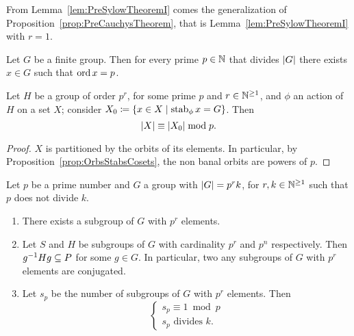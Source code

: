 From Lemma~\ref{lem:PreSylowTheoremI} comes the generalization of Proposition~\ref{prop:PreCauchysTheorem}, that is Lemma~\ref{lem:PreSylowTheoremI} with \(r=1\).

\begin{proposition}\label{prop:CauchysTheorem}
Let \(G\) be a finite group. Then for every prime \(p \in \mathbb N\) that divides \(\left\lvert G\right\rvert\) there exists \(x \in G\) such that \(\operatorname{ord} x = p\).
\end{proposition}

\begin{lemma}\label{lem:PreSylowTheoremII}
Let \(H\) be a group of order \(p^r\), for some prime \(p\) and \(r \in \mathbb N^{\ge 1}\), and \(\phi\) an action of \(H\) on a set \(X\); consider \(X_0 \coloneq \left\{x \in X \mid \operatorname{stab}_\phi x = G\right\}\). Then
\[\left\lvert X\right\rvert \equiv \left\lvert X_0\right\rvert \bmod p .\]
\end{lemma}

\begin{proof}
\(X\) is partitioned by the orbits of its elements. In particular, by Proposition~\ref{prop:OrbsStabsCosets}, the non banal orbits are powers of \(p\).
\end{proof}

\begin{proposition}\label{prop:SylowTheorem}
Let \(p\) be a prime number and  \(G\) a group with \(\left\lvert G\right\rvert = p^rk\), for \(r, k \in \mathbb N^{\ge 1}\) such that \(p\) does not divide \(k\).
\begin{enumerate}
\item There exists a subgroup of \(G\) with \(p^r\) elements.
\item Let \(S\) and \(H\) be subgroups of \(G\) with cardinality \(p^r\) and \(p^n\) respectively. Then \(g^{-1} H g \subseteq P\) for some \(g \in G\). In particular, two any subgroups of \(G\) with \(p^r\) elements are conjugated.
\item Let \(s_p\) be the number of subgroups of \(G\) with \(p^r\) elements. Then %
\[\begin{cases}
s_p \equiv 1 \bmod p \\
s_p \text{ divides } k .
\end{cases}\]
\end{enumerate}
\end{proposition}

